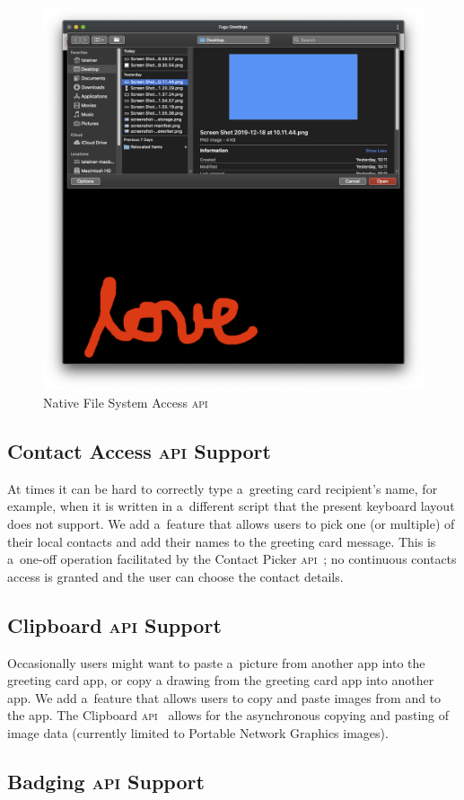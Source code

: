 \documentclass[sigconf]{acmart}
\begin{document}
\begin{figure}[hbt]
  \includegraphics[width=0.5\columnwidth]{file.png}
  \caption{Native File System Access \textsc{api}}
  \label{fig:file}
\end{figure}

\subsection{Contact Access \textsc{api} Support}

At times it can be hard to correctly type a~greeting card recipient's name,
for example, when it is written in a~different script
that the present keyboard layout does not support.
We add a~feature that allows users to pick one (or multiple) of their local contacts
and add their names to the greeting card message.
This is a~one-off operation facilitated by the Contact Picker \textsc{api}~\cite{beverloo19};
no continuous contacts access is granted
and the user can choose the contact details.

\subsection{Clipboard \textsc{api} Support}

Occasionally users might want to paste a~picture from another app into the greeting card app,
or copy a drawing from the greeting card app into another app.
We add a~feature that allows users to copy and paste images from and to the app.
The Clipboard \textsc{api}~\cite{kacmarcik19} allows for the asynchronous copying and pasting
of image data (currently limited to Portable Network Graphics images).

\subsection{Badging \textsc{api} Support}
\end{document}
